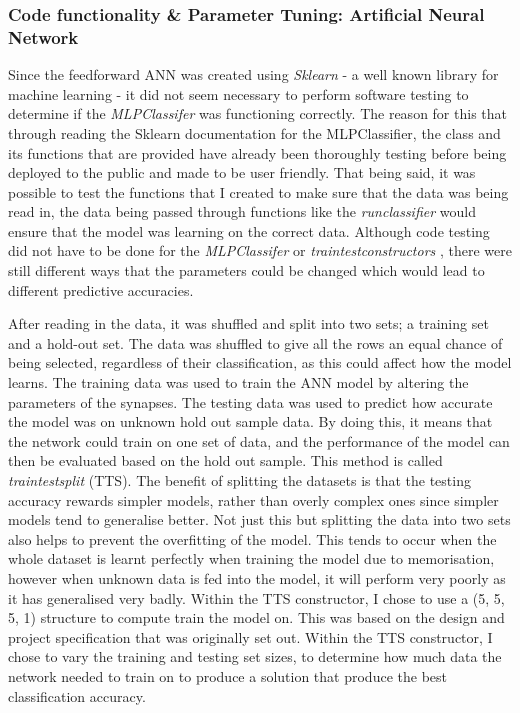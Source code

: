 \documentclass[11pt]{article}
\begin{document}
\subsubsection{Code functionality \& Parameter Tuning: Artificial Neural Network}
Since the feedforward ANN was created using \textit{Sklearn} - a well known library for machine learning  - it did not seem necessary to perform software testing to determine if the \textit{MLPClassifer} was functioning correctly. The reason for this that through reading the Sklearn documentation for the MLPClassifier, the class and its functions that are provided have already been thoroughly testing before being deployed to the public and made to be user friendly. That being said, it was possible to test the functions that I created to make sure that the data was being read in, the data being passed through functions like the \textit{run\textunderscore classifier} would ensure that the model was learning on the correct data.
Although code testing did not have to be done for the \textit{MLPClassifer} or \textit{train\textunderscore test\textunderscore constructors} , there were still different ways that the parameters could be changed which would lead to different predictive accuracies. 

After reading in the data, it was shuffled and split into two sets;  a training set and a hold-out set. The data was shuffled to give all the rows an equal chance of being selected, regardless of their classification, as this could affect how the model learns.  The training data was used to train the ANN model by altering the parameters of the synapses. The testing data was used to predict how accurate the model was on unknown hold out sample data. By doing this, it means that the network could train on one set of data, and the performance of the model can then be evaluated based on the hold out sample. This method is called \textit{train\textunderscore test\textunderscore split} (TTS). The benefit of splitting the datasets is that the testing accuracy rewards simpler models, rather than overly complex ones since simpler models tend to generalise better. Not just this but splitting the data into two sets also helps to prevent the overfitting of the model. This tends to occur when the whole dataset is learnt perfectly when training the model due to memorisation, however when unknown data is fed into the model, it will perform very poorly as it has generalised very badly. 
Within the TTS constructor, I chose to use a (5, 5, 5, 1) structure to compute train the model on. This was based on the design and project specification that was originally set out. Within the TTS constructor, I chose to vary the training and testing set sizes, to determine how much data the network needed to train on to produce a solution that produce the best classification accuracy. 
\end{document}
